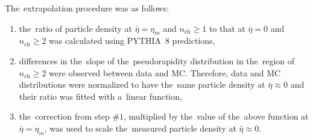 The~extrapolation procedure was as follows:
\begin{enumerate} 
		\item the~ratio of particle density at $\bar{\eta}=\eta_{m}$ and $n_\textrm{ch}\geq1$ to that at $\bar{\eta}=0$ and $n_\textrm{ch}\geq2$ was calculated using PYTHIA~8 predictions,
		\item differences in the~slope of the~pseudorapidity distribution in the~region of $n_\textrm{ch}\geq2$ were observed between data and MC. Therefore, data and MC distributions were normalized to have the~same particle density at  $\bar{\eta}\approx 0$ and their ratio was fitted with
		a~linear function,
		
		\item  the~correction from step $\#1$,  multiplied by the~value of the~above function at $\bar{\eta}=\eta_{m}$, was used to scale the~measured particle density at $\bar{\eta}\approx0$. 
	
\end{enumerate}

